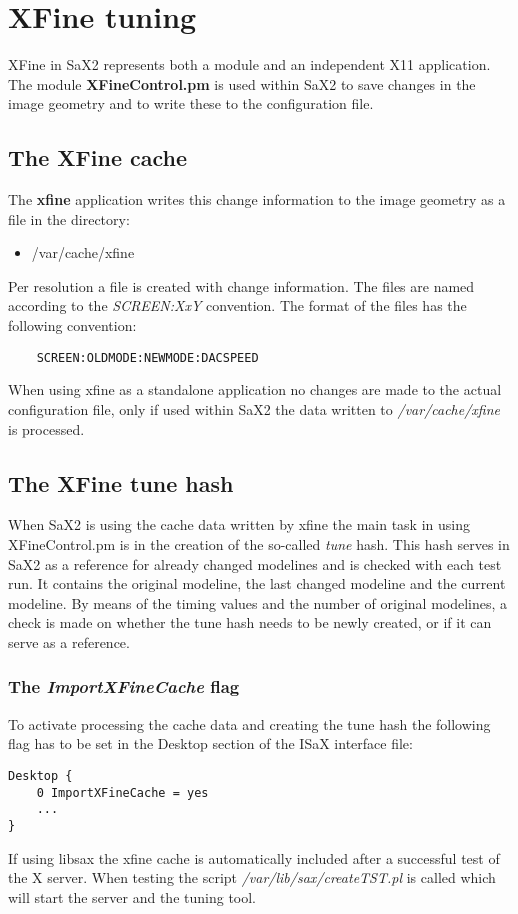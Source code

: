 \chapter{XFine tuning}
\label{cha:xfi}
\minitoc
XFine in SaX2 represents both a module and an independent X11
application. The module \textbf{XFineControl.pm} is used within SaX2 to save
changes in the image geometry and to write these to the configuration file.

\section{The XFine cache}
The \textbf{xfine} application writes this change information to the image
geometry as a file in the directory:
\begin{itemize}
\item /var/cache/xfine
\end{itemize}
Per resolution a file is created with change information. The files are named
according to the \textit{SCREEN:XxY} convention.
The format of the files has the following convention:
\begin{verbatim}
    SCREEN:OLDMODE:NEWMODE:DACSPEED
\end{verbatim}

When using xfine as a standalone application no changes are made
to the actual configuration file, only if used within SaX2 the data written
to \textit{/var/cache/xfine} is processed.

\section{The XFine tune hash}
When SaX2 is using the cache data written by xfine the
main task in using XFineControl.pm is in the creation of the
so-called \textit{tune} hash. This hash serves in SaX2 as a reference
for already changed modelines and is checked with each test run. It
contains the original modeline, the last changed modeline and the
current modeline. By means of the timing values and the number of
original modelines, a check is made on whether the tune hash needs to be
newly created, or if it can serve as a reference.

\newpage

\subsection{The \textit{ImportXFineCache} flag}
To activate processing the cache data and creating the tune hash the
following flag has to be set in the Desktop section of the ISaX
interface file:

\begin{verbatim}
Desktop {
    0 ImportXFineCache = yes
    ...
}
\end{verbatim}

If using libsax the xfine cache is automatically included after a
successful test of the X server. When testing the script
\textit{/var/lib/sax/createTST.pl} is called which will start the
server and the tuning tool.
